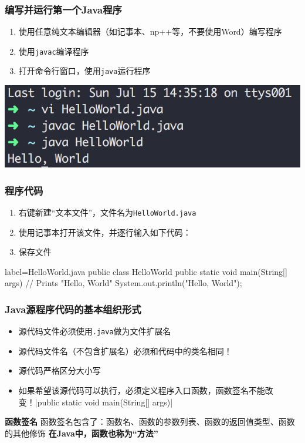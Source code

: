 \begin{frame}
  \frametitle{编写并运行第一个Java程序}
  \begin{enumerate}
    \item 使用任意纯文本编辑器（如记事本、np++等，不要使用Word）编写程序
    \item 使用\texttt{javac}编译程序
    \item 打开命令行窗口，使用\texttt{java}运行程序
  \end{enumerate}
  \includegraphics[width=\textwidth*2/3]{figures/hello_world}

\end{frame}

\begin{frame}[fragile]
  \frametitle{程序代码}
  \begin{enumerate}
    \item 右键新建“文本文件”，文件名为\texttt{HelloWorld.java}
    \item 使用记事本打开该文件，并逐行输入如下代码：
    \item 保存文件
  \end{enumerate}
\begin{javacode*}{label=HelloWorld.java}
public class HelloWorld {
   public static void main(String[] args) {
      // Prints "Hello, World"
      System.out.println("Hello, World");
   }
}
\end{javacode*}
\end{frame}

\begin{frame}
  \frametitle{Java源程序代码的基本组织形式}
  \begin{itemize}
    \item 源代码文件必须使用\texttt{.java}做为文件扩展名
    \item 源代码文件名（不包含扩展名）必须和代码中的类名相同！
    \item 源代码严格区分大小写
    \item 如果希望该源代码可以执行，必须定义程序入口函数，函数签名不能改变！\java|public static void main(String[] args)|
  \end{itemize}
  \begin{block}{\textbf{函数签名}}
    函数签名包含了：函数名、函数的参数列表、函数的返回值类型、函数的其他修饰
    \textbf{在Java中，函数也称为“方法”}
  \end{block}

\end{frame}

